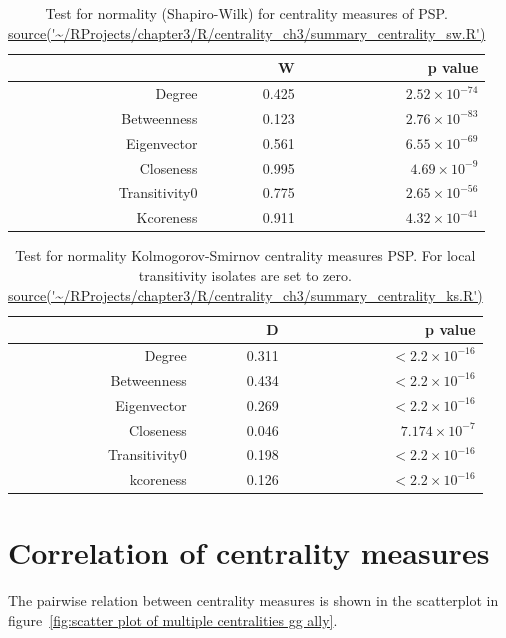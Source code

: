 \begin{table}[ht]
\centering
\begin{tabular}{rrr}
  \toprule
 & W & p value \\ 
  \midrule
Degree & 0.425 & $2.52 \times 10^{-74}$ \\ 
 Betweenness & 0.123 & $2.76 \times 10^{-83}$ \\ 
 Eigenvector & 0.561 & $6.55 \times 10^{-69}$ \\ 
 Closeness & 0.995 & $4.69 \times 10^{-9}$ \\ 
 Transitivity0 & 0.775 & $2.65 \times 10^{-56}$ \\ 
 Kcoreness & 0.911 & $4.32 \times 10^{-41}$ \\ 
   \bottomrule
\end{tabular}
\caption[Shapiro-Wilk tests for centrality measures in the PSP]{Test for normality (Shapiro-Wilk) for centrality measures of PSP.
\url{source('~/RProjects/chapter3/R/centrality_ch3/summary_centrality_sw.R')}}
\label{tab:Test for normality (Shapiro-Wilk) for centrality measures of PSP}
\end{table}

\begin{table}[ht]
\centering
\begin{tabular}{rrr}
  \toprule
 & D & p value \\ 
  \midrule
Degree & 0.311 & $<2.2 \times 10^{-16}$ \\ 
  Betweenness & 0.434 & $<2.2 \times 10^{-16}$ \\ 
  Eigenvector & 0.269 & $<2.2 \times 10^{-16}$ \\ 
  Closeness & 0.046 & $7.174 \times 10^{-7}$ \\ 
  Transitivity0 & 0.198 & $<2.2 \times 10^{-16}$ \\ 
  kcoreness & 0.126 & $<2.2 \times 10^{-16}$ \\ 
   \bottomrule
\end{tabular}
\caption[Kolmogorov-Smirnov tests - centrality measures in the PSP]{Test for normality Kolmogorov-Smirnov centrality measures PSP. For local transitivity isolates are set to zero. \url{source('~/RProjects/chapter3/R/centrality_ch3/summary_centrality_ks.R')}}
\label{tab:Test for normality (KS) for centrality measures of PSP}
\end{table}
\section{Correlation of centrality measures}
\label{sec:correlation of centrality measures results section}
The pairwise relation between centrality measures is shown in the scatterplot in figure~\ref{fig:scatter plot of multiple centralities gg ally}. 



